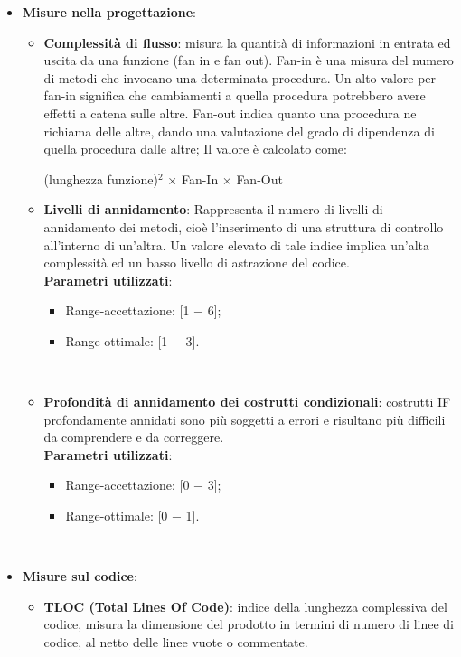 \begin{itemize}
	\item \textbf{Misure nella progettazione}:
	\begin{itemize}
		\item \textbf{Complessità di flusso}: 
		misura la quantità di informazioni in entrata ed uscita da una funzione (fan in e fan out). Fan-in è una misura del numero di metodi che invocano una determinata procedura. Un alto valore per fan-in significa che cambiamenti a quella procedura potrebbero avere effetti a catena sulle altre. Fan-out indica quanto una procedura ne richiama delle altre, dando una valutazione del grado di dipendenza di quella procedura dalle altre; Il valore è calcolato come: 
		\begin{center}
					(lunghezza funzione)$^2$ × Fan-In × Fan-Out
		\end{center}
		\item \textbf{Livelli di annidamento}: Rappresenta il numero di livelli di annidamento dei metodi, cioè l'inserimento di una struttura di controllo all'interno di un'altra. Un valore elevato di tale indice implica un'alta complessità ed un basso livello di astrazione del codice. \\
		
		\textbf{Parametri utilizzati}:
		\begin{itemize}
			\item Range-accettazione: [1 − 6];
			\item Range-ottimale: [1 − 3].
		\end{itemize} \\ \bigskip
		
		\item \textbf{Profondità di annidamento dei costrutti condizionali}: costrutti IF profondamente annidati sono più soggetti a errori e risultano più difficili da comprendere e da correggere. \\
		
		\textbf{Parametri utilizzati}:
		\begin{itemize}
			\item Range-accettazione: [0 − 3];
			\item Range-ottimale: [0 − 1].
		\end{itemize} \\ \bigskip
		
	\end{itemize}
	\item \textbf{Misure sul codice}:
	\begin{itemize}

		\item \textbf{TLOC (Total Lines Of Code)}: indice della lunghezza complessiva del codice, misura la dimensione del prodotto in termini di numero di linee di codice, al netto delle linee vuote o commentate.
		

\end{itemize}
\end{itemize}
